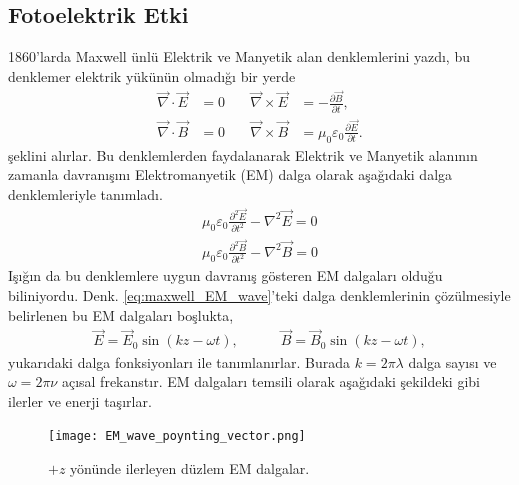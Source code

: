 \documentclass[a4paper,12pt, twoside]{article}
\begin{document}




\subsection{Fotoelektrik Etki}

1860'larda Maxwell ünlü Elektrik ve Manyetik alan denklemlerini yazdı, bu denklemer elektrik yükünün olmadığı bir yerde 
\begin{align}
\label{eq:maxwell}
  \vec \nabla \cdot \vec{E} &= 0 \quad & \vec \nabla \times \vec{E} &=              -\frac{\partial\vec B}{\partial t}, \\
    \vec \nabla \cdot \vec{B} &= 0 \quad &\vec \nabla \times \vec{B} &= \mu_0\varepsilon_0 \frac{\partial\vec E}{\partial t}.
\end{align}
şeklini alırlar. Bu denklemlerden faydalanarak Elektrik ve Manyetik alanının zamanla davranışını Elektromanyetik (EM) dalga olarak aşağıdaki dalga denklemleriyle tanımladı. 
\begin{align}
\label{eq:maxwell_EM_wave}
  \mu_0\varepsilon_0  \frac{\partial^2   \vec{E}}{\partial t^2} - \nabla^2   \vec{E} = 0 \\
  \mu_0\varepsilon_0 \frac{\partial^2   \vec{B}}{\partial t^2} - \nabla^2 \vec{B} = 0 \nonumber
\end{align}
Işığın da bu denklemlere uygun davranış gösteren EM dalgaları olduğu biliniyordu. Denk. \ref{eq:maxwell_EM_wave}'teki dalga denklemlerinin çözülmesiyle belirlenen bu EM dalgaları boşlukta, 
\begin{align}
\label{eq:EM_waves}
\vec E = \vec E_0 \sin(kz-\omega t),\hspace{36pt} \vec B = \vec B_0 \sin(kz-\omega t), 
\end{align}
yukarıdaki dalga fonksiyonları ile tanımlanırlar. Burada $k=2\pi\lambda$ dalga sayısı ve $\omega=2\pi\nu$ açısal frekanstır. EM dalgaları temsili olarak aşağıdaki şekildeki gibi ilerler ve enerji taşırlar.
\begin{figure}[hbtp]
\center
\texttt{[image: EM\_wave\_poynting\_vector.png]}
\caption{$+z$ yönünde ilerleyen düzlem EM dalgalar.}
\label{fig:poynting}
\end{figure}
\end{document}
